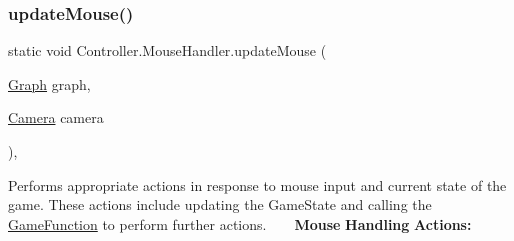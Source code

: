 \subsubsection{\texorpdfstring{update\+Mouse()}{updateMouse()}}
{\footnotesize\ttfamily static void Controller.\+Mouse\+Handler.\+update\+Mouse (\begin{DoxyParamCaption}\item[{\hyperlink{class_model_1_1_map_module_1_1_graph}{Graph}}]{graph,  }\item[{\hyperlink{class_view_1_1_camera}{Camera}}]{camera }\end{DoxyParamCaption})\hspace{0.3cm}{\ttfamily [inline]}, {\ttfamily [static]}}

Performs appropriate actions in response to mouse input and current state of the game. These actions include updating the Game\+State and calling the \hyperlink{class_controller_1_1_game_function}{Game\+Function} to perform further actions. ~\newline
~\newline
 {\bfseries Mouse} {\bfseries Handling} {\bfseries Actions\+:} 
